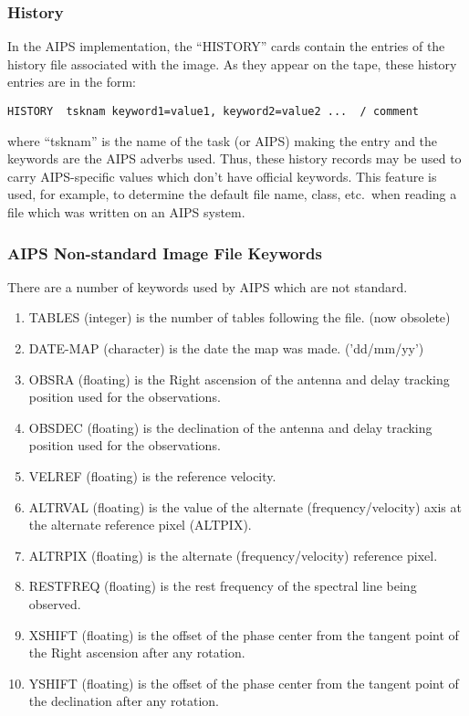 \subsubsection{History }
In the AIPS implementation, the ``HISTORY'' cards contain the entries of
the history file associated with the image.  As they appear on the
tape, these history entries are in the form:

\begin{verbatim}
HISTORY  tsknam keyword1=value1, keyword2=value2 ...  / comment

\end{verbatim}
where ``tsknam'' is the name of the task (or AIPS) making the entry and
the keywords are the AIPS adverbs used.  Thus, these history records
may be used to carry AIPS-specific values which don't have official
keywords.  This feature is used, for example, to determine the default
file name, class, etc.~when reading a file which was written on an
AIPS system.

\subsubsection{AIPS Non-standard Image File Keywords }
There are a number of keywords used by AIPS which are not standard.
\begin{enumerate} %
\item TABLES (integer) is the number of tables following the file. (now
obsolete)
\item DATE-MAP (character) is the date the map was made. ('dd/mm/yy')
\item OBSRA (floating) is the Right ascension of the antenna and delay
tracking position used for the observations.
\item OBSDEC (floating) is the declination of the antenna and delay tracking
position used for the observations.
\item VELREF (floating) is the reference velocity.
\item ALTRVAL (floating) is the value of the alternate (frequency/velocity)
axis at the alternate reference pixel (ALTPIX).
\item ALTRPIX (floating) is the alternate (frequency/velocity) reference
pixel.
\item RESTFREQ (floating) is the rest frequency of the spectral line being
observed.
\item XSHIFT  (floating) is the offset of the phase center from the tangent
point of the Right ascension after any rotation.
\item YSHIFT (floating) is the offset of the phase center from the tangent
point of the declination after any rotation.
\end{enumerate} %

